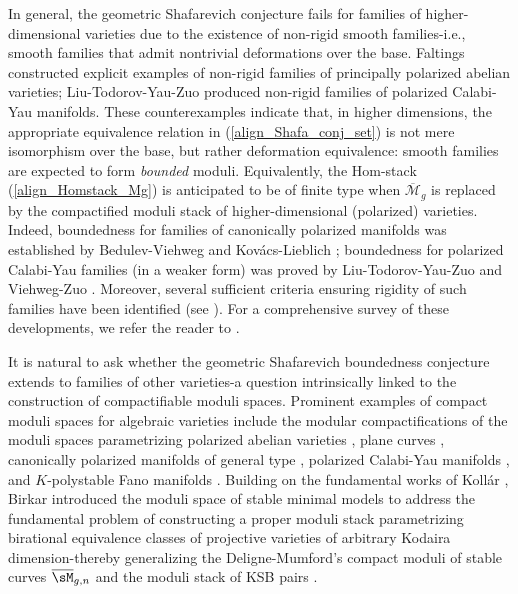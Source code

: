 \documentclass[11pt,letterpaper]{amsart}
\numberwithin{equation}{section}
\begin{document}
	In general, the geometric Shafarevich conjecture fails for families of higher-dimensional varieties due to the existence of non-rigid smooth families-i.e., smooth families that admit nontrivial deformations over the base. Faltings \cite{Faltings1983} constructed explicit examples of non-rigid families of principally polarized abelian varieties;  Liu-Todorov-Yau-Zuo \cite{LTYZ2005} produced non-rigid families of polarized Calabi-Yau manifolds. These counterexamples indicate that, in higher dimensions, the appropriate equivalence relation in (\ref{align_Shafa_conj_set}) is not mere isomorphism over the base, but rather deformation equivalence: smooth families are expected to form \emph{bounded} moduli. Equivalently, the Hom-stack (\ref{align_Homstack_Mg}) is anticipated to be of finite type when $\overline{\mathcal{M}}_g$ is replaced by the compactified moduli stack of higher-dimensional (polarized) varieties. Indeed, boundedness for families of canonically polarized manifolds was established by Bedulev-Viehweg \cite{Viehweg2000} and Kov\'acs-Lieblich \cite{Kovacs2011}; boundedness for polarized Calabi-Yau families  (in a weaker form) was proved by Liu-Todorov-Yau-Zuo \cite{LTYZ2005} and Viehweg-Zuo \cite{VZ2003_2}. Moreover, several sufficient criteria ensuring rigidity of such families have been identified (see \cite{VZ2003_2,Kovacs2005}). For a comprehensive survey of these developments, we refer the reader to \cite{Kovacs2009}.
	
	It is natural to ask whether the geometric Shafarevich boundedness conjecture extends to families of other varieties-a question intrinsically linked to the construction of compactifiable moduli spaces. Prominent examples of compact moduli spaces for algebraic varieties include the modular compactifications of the moduli spaces parametrizing polarized abelian varieties \cite{Alexeev2002}, plane curves \cite{Hacking2004}, canonically polarized manifolds of general type \cite{Kollar1988,Kollar2010,Kollar2023}, polarized Calabi-Yau manifolds \cite{KX2020}, and $K$-polystable Fano manifolds \cite{Xu2020}. Building on the fundamental works of Koll\'ar \cite{Kollar2010,Kollar2023}, Birkar \cite{Birkar2022} introduced the moduli space of stable minimal models to address the fundamental problem of constructing a proper moduli stack parametrizing birational equivalence classes of projective varieties of arbitrary Kodaira dimension-thereby generalizing the Deligne-Mumford's compact moduli of stable curves $\overline{\sM}_{g,n}$ and the moduli stack of KSB pairs \cite{Kollar1988,Kollar2010,Kollar2023}.
	
\end{document}
